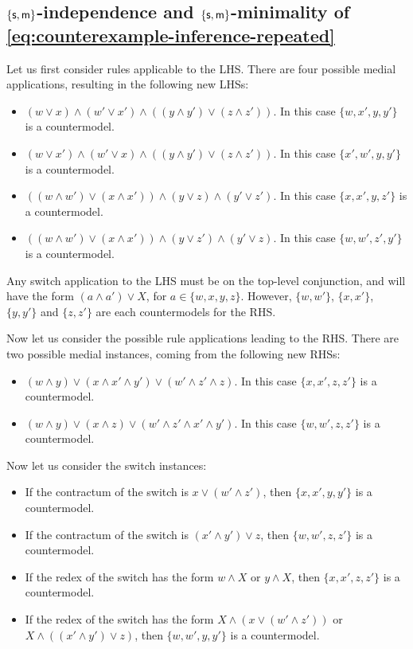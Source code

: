 \documentclass[a4paper, UKenglish, cleveref]{lipics-v2019}
\begin{document}
\subsection{$\{\mathsf{s},\mathsf{m} \}$-independence and $\{\mathsf{s},\mathsf{m} \}$-minimality of \cref{eq:counterexample-inference-repeated}}
\label{sec:ind-min-counterexample-inference}
Let us first consider rules applicable to the LHS.
There are four possible medial applications, resulting in the following new LHSs:
\begin{itemize}
\item $(w \lor x) \land (w' \lor x' ) \land ((y \land y') \lor (z \land z'))$. In this case $\{w,x',y,y' \}$ is a countermodel.
\item $(w \lor x') \land (w' \lor x) \land ((y \land y') \lor (z \land z'))$. In this case $\{x',w',y, y' \}$ is a countermodel.
\item $((w \land w') \lor (x \land x')) \land (y \lor z) \land (y' \lor z' )$. In this case $\{ x,x',y,z' \}$ is a countermodel.
\item $((w \land w') \lor (x \land x')) \land (y \lor z' ) \land (y' \lor z)$. In this case $\{ w,w',z', y'  \}$ is a countermodel.
\end{itemize}
Any switch application to the LHS must be on the top-level conjunction, and will have the form $(a \land a') \lor X$, for $a \in \{w,x,y,z \}$. However, $\{w,w' \}$, $\{x,x' \}$, $\{y,y' \}$ and $\{z,z'\}$ are each countermodels for the RHS.

Now let us consider the possible rule applications leading to the RHS.
There are two possible medial instances, coming from the following new RHSs:
\begin{itemize}
\item $(w \land y) \lor (x \land x' \land y') \lor (w' \land z' \land z)$. In this case $\{x,x',z,z'\}$ is a countermodel.
\item $(w \land y) \lor (x \land z) \lor (w' \land z' \land x' \land y')$. In this case $\{ w,w',z,z' \}$ is a countermodel.
\end{itemize}
Now let us consider the switch instances:
\begin{itemize}
\item If the contractum of the switch is $x \lor (w' \land z')$, then $\{x,x',y,y'\}$ is a countermodel.
\item If the contractum of the switch is $(x' \land y') \lor z$, then $\{w,w',z,z'\}$ is a countermodel.
\item If the redex of the switch has the form $w \land X$ or $y \land X$, then $\{x,x',z,z'\}$ is a countermodel.
\item If the redex of the switch has the form $X \land (x \lor (w' \land z'))$ or $X \land ((x' \land y') \lor z)$, then $\{ w,w',y,y' \}$ is a countermodel.
\end{itemize}
\end{document}
